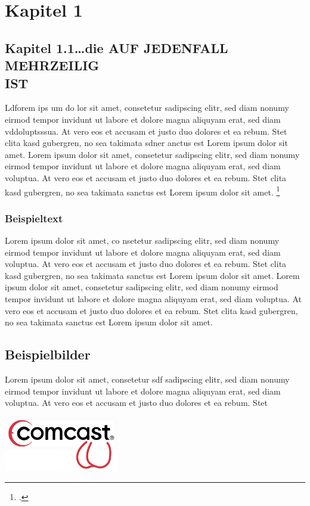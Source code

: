 \section{Kapitel 1}

\subsection{Kapitel 1.1\ldots die AUF JEDENFALL MEHRZEILIG\\IST}

Ldforem ips um do lor sit amet, consetetur sadipscing elitr, \label{Referenz}
sed diam  nonumy eirmod tempor invidunt ut labore et dolore magna aliquyam erat,
sed diam vddoluptsssua. At vero eos et accusam et justo duo dolores et ea rebum.
Stet clita kasd gubergren, no sea takimata sdner anctus est Lorem ipsum dolor sit amet. Lorem ipsum dolor sit amet, consetetur sadipscing elitr, sed diam nonumy eirmod tempor invidunt ut labore et dolore magna aliquyam erat, sed diam voluptua. At vero eos et accusam et justo duo dolores et ea rebum. Stet clita kasd gubergren, no sea takimata sanctus est Lorem ipsum dolor sit amet.
\footcite[Vgl.][Experto.de, Artikel über das und jenes]{praxishandbuch:bpmn2}
\subsubsection{Beispieltext}
Lorem ipsum dolor sit amet, co nsetetur sadipscing elitr, sed diam
nonumy eirmod tempor invidunt ut labore et dolore magna aliquyam erat, sed diam voluptua. At vero eos et accusam et justo duo dolores et ea rebum. Stet clita kasd gubergren, no sea takimata sanctus est Lorem ipsum dolor sit amet. Lorem ipsum dolor sit amet, consetetur sadipscing elitr, sed diam nonumy eirmod tempor invidunt ut labore et dolore magna aliquyam erat, sed diam voluptua. At vero eos et accusam et justo duo dolores et ea rebum. Stet clita kasd gubergren, no sea takimata sanctus est Lorem ipsum dolor sit amet.

\clearpage

\subsection{Beispielbilder}
Lorem ipsum dolor sit amet, consetetur  sdf sadipscing elitr, sed diam nonumy eirmod tempor invidunt ut labore et dolore magna aliquyam erat, sed diam voluptua. At vero eos et accusam et justo duo dolores et ea rebum. Stet

\begin{center}
	\includegraphics[width=5cm]{images/company_logo.png}
\end{center}

